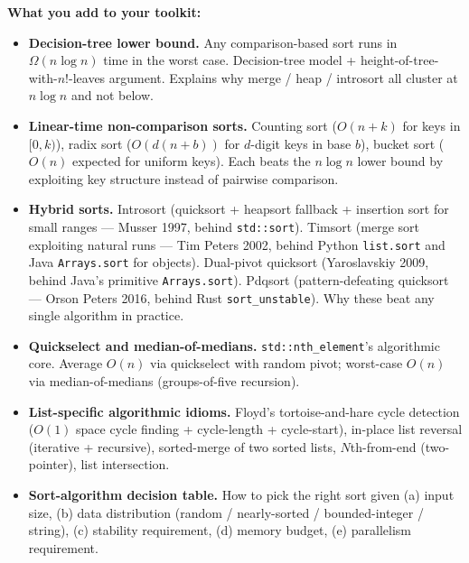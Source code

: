 \documentclass[11pt]{article}
\begin{document}
\begin{ideabox}
\textbf{What you add to your toolkit:}
\begin{itemize}
    \item \textbf{Decision-tree lower bound.} Any comparison-based
          sort runs in $\Omega(n \log n)$ time in the worst case.
          Decision-tree model + height-of-tree-with-$n!$-leaves
          argument. Explains why merge / heap / introsort all
          cluster at $n \log n$ and not below.
    \item \textbf{Linear-time non-comparison sorts.} Counting sort
          ($O(n + k)$ for keys in $[0, k)$), radix sort
          ($O(d(n + b))$ for $d$-digit keys in base $b$), bucket
          sort ($O(n)$ expected for uniform keys). Each beats the
          $n \log n$ lower bound by exploiting key structure
          instead of pairwise comparison.
    \item \textbf{Hybrid sorts.} Introsort (quicksort + heapsort
          fallback + insertion sort for small ranges --- Musser
          1997, behind \texttt{std::sort}). Timsort (merge sort
          exploiting natural runs --- Tim Peters 2002, behind
          Python \texttt{list.sort} and Java \texttt{Arrays.sort}
          for objects). Dual-pivot quicksort (Yaroslavskiy 2009,
          behind Java's primitive \texttt{Arrays.sort}). Pdqsort
          (pattern-defeating quicksort --- Orson Peters 2016,
          behind Rust \texttt{sort\_unstable}). Why these beat any
          single algorithm in practice.
    \item \textbf{Quickselect and median-of-medians.}
          \texttt{std::nth\_element}'s algorithmic core. Average
          $O(n)$ via quickselect with random pivot;
          worst-case $O(n)$ via median-of-medians (groups-of-five
          recursion).
    \item \textbf{List-specific algorithmic idioms.} Floyd's
          tortoise-and-hare cycle detection ($O(1)$ space cycle
          finding + cycle-length + cycle-start), in-place list
          reversal (iterative + recursive), sorted-merge of two
          sorted lists, $N$th-from-end (two-pointer), list
          intersection.
    \item \textbf{Sort-algorithm decision table.} How to pick the
          right sort given (a) input size, (b) data distribution
          (random / nearly-sorted / bounded-integer / string), (c)
          stability requirement, (d) memory budget, (e) parallelism
          requirement.
\end{itemize}


\end{ideabox}
\end{document}

